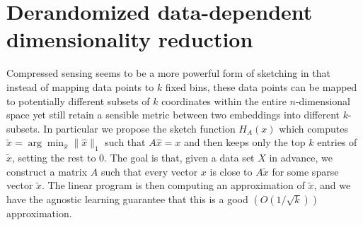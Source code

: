 \documentclass[english]{article}
\begin{document}
\section{Derandomized data-dependent dimensionality reduction}

Compressed sensing seems to be a more powerful form of sketching in that instead of mapping data points to $k$ fixed bins, these data points can be mapped to potentially different subsets of $k$ coordinates within the entire $n$-dimensional space yet still retain a sensible metric between two embeddings into different $k$-subsets. In particular we propose the sketch function $H_A(x)$ which computes $\tilde{x} = \arg\min_{\hat{x}} \|\hat{x}\|_1$ such that $A\hat{x}=x$ and then keeps only the top $k$ entries of $\tilde{x}$, setting the rest to $0$. The goal is that, given a data set $X$ in advance, we construct a matrix $A$ such that every vector $x$ is close to $A\tilde{x}$ for some sparse vector $\tilde{x}$. The linear program is then computing an approximation of $\tilde{x}$, and we have the agnostic learning guarantee that this is a good $\left(O(1/\sqrt{k})\right)$ approximation. 



\end{document}
